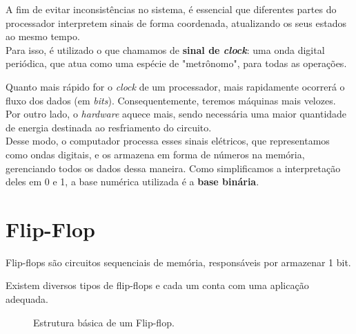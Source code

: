 \documentclass[12pt]{article}
\begin{document}
\begin{tcolorbox}
A fim de evitar inconsistências no sistema, é essencial que diferentes partes do processador interpretem sinais de forma coordenada, atualizando os seus estados ao mesmo tempo.
\vspace{0.1cm} \\
Para isso, é utilizado o que chamamos de \textbf{sinal de \textit{clock}}: uma onda digital periódica, que atua como uma espécie de "metrônomo", para todas as operações.
\end{tcolorbox}

\noindent
Quanto mais rápido for o \textit{clock} de um processador, mais rapidamente ocorrerá o fluxo dos dados (em \textit{bits}). Consequentemente, teremos máquinas mais velozes.
\vspace{0.2cm} \\
Por outro lado, o \textit{hardware} aquece mais, sendo necessária uma maior quantidade de energia destinada ao resfriamento do circuito.
\vspace{0.2cm} \\
\noindent
Desse modo, o computador processa esses sinais elétricos, que representamos como ondas digitais, e os armazena em forma de números na memória, gerenciando todos os dados dessa maneira. Como simplificamos a interpretação deles em 0 e 1, a base numérica utilizada é a \textbf{base binária}.

\newpage
\section{Flip-Flop}

Flip-flops são circuitos sequenciais de memória, responsáveis por armazenar 1 bit.


Existem diversos tipos de flip-flops e cada um conta com uma aplicação adequada.

\begin{figure}[h]
\centering
{}
\caption{Estrutura básica de um Flip-flop.}
\end{figure}
\end{document}

